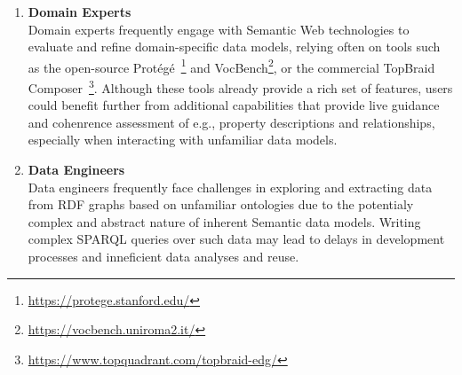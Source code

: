 \begin{enumerate}
\item \textbf{Domain Experts}\\
   Domain experts frequently engage with Semantic Web technologies to evaluate and refine domain-specific data models, relying often on tools such as the open-source Protégé~\footnote{\url{https://protege.stanford.edu/}} and VocBench\footnote{\url{https://vocbench.uniroma2.it/}}, or the commercial TopBraid Composer~\footnote{\url{https://www.topquadrant.com/topbraid-edg/}}.
   Although these tools already provide a rich set of features, users could benefit further from additional capabilities that provide live guidance and cohenrence assessment of e.g., property descriptions and relationships, especially when interacting with unfamiliar data models.

  \item \textbf{Data Engineers}\\
    Data engineers frequently face challenges in exploring and extracting data from RDF graphs based on unfamiliar ontologies due to the potentialy complex and abstract nature of inherent Semantic data models.
    Writing complex SPARQL queries over such data may lead to delays in development processes and inneficient data analyses and reuse. 
\end{enumerate}


